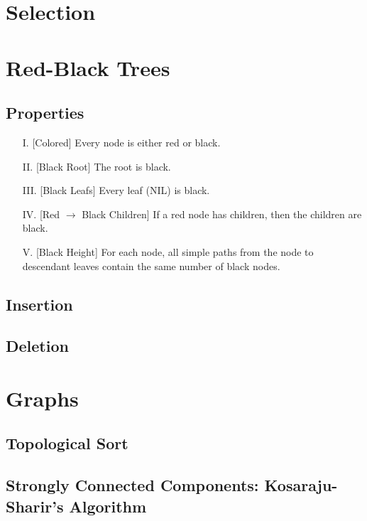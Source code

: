 \documentclass{article}
\begin{document}
\section{Selection}


\section{Red-Black Trees}

\subsection{Properties}
\begin{itemize}
  \item[I.]\label{properties:1} [Colored] Every node is either red or black.
  \item[II.]\label{properties:2} [Black Root] The root is black.
  \item[III.]\label{properties:3} [Black Leafs] Every leaf (NIL) is black.
  \item[IV.]\label{properties:4} [Red $\to$ Black Children] If a red node has children, then the children are black.
  \item[V.]\label{properties:5} [Black Height] For each node, all simple paths from the node to descendant leaves contain the same number of black nodes.
\end{itemize}

\subsection{Insertion}


\subsection{Deletion}


\section{Graphs}
\subsection{Topological Sort}


\subsection{Strongly Connected Components: Kosaraju-Sharir's Algorithm}

\end{document}
